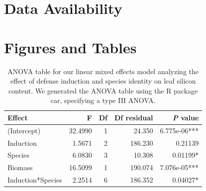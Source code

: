 \documentclass[12pt, letterpaper, ]{report}
\begin{document}
\section{Data Availability}

\printbibliography

\section{Figures and Tables}

\begin{table}[ht]
        \centering
        \caption{ANOVA table for our linear mixed effects model analyzing the effect of defense induction and species identity on leaf silicon content. We generated the ANOVA table using the R package car, specifying a type III ANOVA.}
        \label{Tab:params}
        \begin{tabular}{lrrrr}
                \hline
                \textbf{Effect} & \textbf{F} & \textbf{Df} & \textbf{Df residual} & \textbf{\textit{P} value} \\
                \hline
                (Intercept) & 32.4990 & 1 & 24.350 & 6.775e-06*** \\
                Induction & 1.5671 & 2 & 186.230 & 0.21139 \\   
                Species & 6.0830 & 3 & 10.308 & 0.01199* \\ 
                Biomass & 16.5099 & 1 & 190.074 & 7.076e-05*** \\
                Induction*Species & 2.2514 & 6 & 186.352 & 0.04027* \\
                \hline
        \end{tabular}
\end{table}
\end{document}
